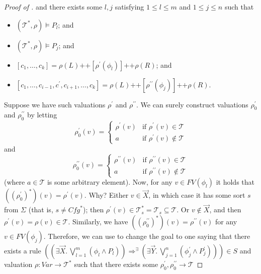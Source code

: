 \documentclass{article}
\begin{document}
\begin{proof}[Proof of ]
and there exists some $l,j$ satisfying $1 \leq l \leq m$ and $1 \leq j \leq n$ such that
\begin{itemize}
    \item $(\mathcal{T}^*, \rho) \vDash P_l$; and
    \item $(\mathcal{T}^*, \rho) \vDash P_j$; and
    \item $[c_1,\ldots,c_k] = \rho(L) \texttt{++} [\rho^\prime(\phi_l)] \texttt{++} \rho(R)$; and
    \item $[c_1, \ldots, c_{i-1}, c^\prime, c_{i+1}, \ldots, c_k] = \rho(L) \texttt{++} [\rho^{\prime\prime}(\phi_j)] 
    \texttt{++} \rho(R)$.
\end{itemize}
Suppose we have such valuations $\rho^\prime$ and $\rho^{\prime\prime}$.
We can surely construct valuations $\rho_0^\prime$ and $\rho_0^{\prime\prime}$ by letting
\begin{equation*}
\rho_0^\prime(v)=
    \begin{cases}
        \rho^\prime(v) & \text{if } \rho^\prime(v) \in \mathcal{T}\\
        a & \text{if } \rho^\prime(v) \not\in \mathcal{T}
    \end{cases}
\end{equation*}
and
\begin{equation*}
\rho_0^{\prime\prime}(v)=
    \begin{cases}
        \rho^{\prime\prime}(v) & \text{if } \rho^{\prime\prime}(v) \in \mathcal{T}\\
        a & \text{if } \rho^{\prime\prime}(v) \not\in \mathcal{T}
    \end{cases}
\end{equation*}
(where $a \in \mathcal{T}$ is some arbitrary element).
Now, for any $v \in \mathit{FV}(\phi_l)$ it holds that
$((\rho_0^\prime)^*)(v) = \rho^\prime(v)$.
Why? Either $v \in \vec{X}$, in which case it has some sort $s$ from $\Sigma$
(that is, $s \not = \mathit{Cfg}^*$);
then $\rho^\prime(v) \in \mathcal{T}^*_s = \mathcal{T}_s \subseteq \mathcal{T}$.
Or $v \not\in \vec{X}$, and then $\rho^\prime(v) = \rho(v) \in \mathcal{T}$.
Similarly, we have
$((\rho_0^{\prime\prime})^*)(v) = \rho^{\prime\prime}(v)$
for any $v \in \mathit{FV}(\phi_j)$.
Therefore, we can use  to change the goal to one saying that
there exists a rule $((\exists \vec{X}.\, \bigvee_{l=1}^{m} (\phi_l \land P_l)) \Rightarrow^\exists (\exists \vec{Y}.\, \bigvee_{j=1}^{n} (\phi^\prime_j \land P^\prime_j))) \in S$
and valuation $\rho : \mathit{Var} \to \mathcal{T}^*$ such that
there exists some $\rho_0^\prime,\rho_0^{\prime\prime} \to \mathcal{T}$

\end{proof}
\end{document}

